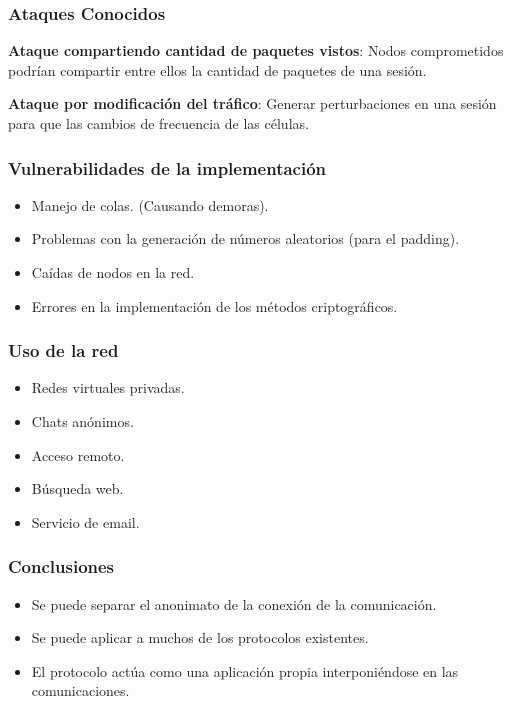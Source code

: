 \documentclass{beamer}
\newcommand{\vspc}{\vspace{0.5cm}}
\begin{document}
\begin{frame}
    \frametitle{Ataques Conocidos}
    \textbf{Ataque compartiendo cantidad de paquetes vistos}: Nodos comprometidos podrían compartir entre ellos la cantidad de paquetes de una sesión.\\
    
    \vspc

    \textbf{Ataque por modificación del tráfico}: Generar perturbaciones en una sesión para que las cambios de frecuencia de las células.\\

\end{frame}

\begin{frame}
    \frametitle{Vulnerabilidades de la implementación}

    \begin{itemize}
        \item Manejo de colas. (Causando demoras).
        \item Problemas con la generación de números aleatorios (para el padding).
        \item Caídas de nodos en la red.
        \item Errores en la implementación de los métodos criptográficos.
    \end{itemize}

\end{frame}

\begin{frame}
    \frametitle{Uso de la red}
    \begin{itemize}
        \item Redes virtuales privadas. 
        \item Chats anónimos.
        \item Acceso remoto.
        \item Búsqueda web.
        \item Servicio de email.
    \end{itemize}
\end{frame}

\begin{frame}
    \frametitle{Conclusiones}
    \begin{itemize}
        \item Se puede separar el anonimato de la conexión de la comunicación.
        \item Se puede aplicar a muchos de los protocolos existentes.
        \item El protocolo actúa como una aplicación propia interponiéndose en las comunicaciones.
    \end{itemize}
\end{frame}
\end{document}
